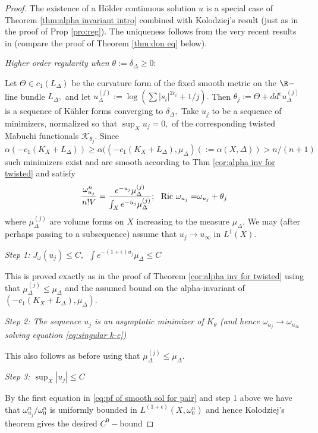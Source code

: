 \documentclass[11pt,oneside,english]{amsart}
\numberwithin{equation}{section}
\numberwithin{figure}{section}
\theoremstyle{plain}
\theoremstyle{plain}
\theoremstyle{plain}
\theoremstyle{plain}
\theoremstyle{remark}
\theoremstyle{definition}
\begin{document}
\begin{proof}
The existence of a Hölder continuous solution $u$ is a special case
of Theorem \ref{thm:alpha invariant intro} combined with Kolodziej's
result (just as in the proof of Prop \ref{pro:reg}). The uniqueness
follows from the very recent results in \cite{bern} (compare the
proof of Theorem \ref{thm:don eq} below). 

\emph{Higher order regularity when $\theta:=\delta_{\Delta}\geq0:$}

Let $\Theta\in c_{1}(L_{\Delta})$ be the curvature form of the fixed
smooth metric on the $\R-$line bundle $L_{\Delta},$ and let $u_{\Delta}^{(j)}:=\log(\sum|s_{i}|^{2c_{i}}+1/j).$
Then $\theta_{j}:=\Theta+dd^{c}u_{\Delta}^{(j)}$ is a sequence of
Kähler forms converging to $\delta_{\Delta},$ Take $u_{j}$ to be
a sequence of minimizers, normalized so that $\sup_{X}u_{j}=0,$ of
the corresponding twisted Mabuchi functionals $\mathcal{K}_{\theta_{j}}.$
Since $\alpha(-c_{1}(K_{X}+L_{\Delta}))\geq\alpha((-c_{1}(K_{X}+L_{\Delta}),\mu_{\Delta})(:=\alpha(X,\Delta))>n/(n+1)$
such minimizers exist and are smooth according to Thm \ref{cor:alpha inv for twisted}
and satisfy 
\begin{equation}
\frac{\omega_{u_{j}}^{n}}{n!V}=\frac{e^{-u_{j}}\mu_{\Delta}^{(j)}}{\int_{X}e^{-u_{j}}\mu_{\Delta}^{(j)}};\,\,\,\,\mbox{Ric \ensuremath{\omega_{u_{j}}=}}\omega_{u_{j}}+\theta_{j}\label{eq:pf of smooth sol for pair}
\end{equation}
 where $\mu_{\Delta}^{(j)}$ are volume forms on $X$ increasing to
the measure $\mu_{\Delta}.$ We may (after perhaps passing to a subsequence)
assume that $u_{j}\rightarrow u_{\infty}$ in $L^{1}(X).$

\emph{Step 1:} $J_{\omega}(u_{j})\leq C,\,\,\,\int e^{-(1+\epsilon)u_{j}}\mu_{\Delta}\leq C$

This is proved exactly as in the proof of Theorem \ref{cor:alpha inv for twisted}
using that $\mu_{\Delta}^{(j)}\leq\mu_{\Delta}$ and the assumed bound
on the alpha-invariant of $(-c_{1}(K_{X}+L_{\Delta}),\mu_{\Delta}).$

\emph{Step 2: The sequence $u_{j}$ is an asymptotic minimizer of
$K_{\theta}$ (and hence $\omega_{u_{j}}\rightarrow\omega_{u_{\infty}}$
solving equation \ref{eq:singular k-e})}

This also follows as before using that $\mu_{\Delta}^{(j)}\leq\mu_{\Delta}.$ 

\emph{Step 3: $\sup_{X}\left|u_{j}\right|\leq C$}

By the first equation in \ref{eq:pf of smooth sol for pair} and step
1 above we have that $\omega_{u_{j}}^{n}/\omega_{0}^{n}$ is uniformly
bounded in $L^{(1+\epsilon)}(X,\omega_{0}^{n})$ and hence Kolodziej's
theorem \cite{ko} gives the desired $C^{0}-$bound


\end{proof}
\end{document}

